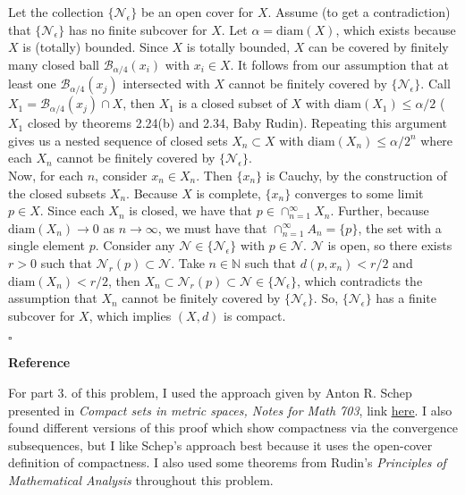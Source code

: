 \documentclass[11pt]{article}
\begin{document}
\begin{enumerate}
	Let the collection $\{\mathcal{N}_\epsilon\}$ be an open cover for $X$. Assume (to get a contradiction) that $\{\mathcal{N}_\epsilon \}$ has no finite subcover for $X$. Let $\alpha = \text{diam}(X)$, which exists because $X$ is (totally) bounded. Since $X$ is totally bounded, $X$ can be covered by finitely many closed ball $\mathcal{B}_{\alpha/4}(x_i)$ with $x_i \in X$. It follows from our assumption that at least one $\mathcal{B}_{\alpha/4}(x_j)$ intersected with $X$ cannot be finitely covered by $\{\mathcal{N}_\epsilon\}$. Call $X_1 = \mathcal{B}_{\alpha/4}(x_j) \cap X$, then $X_1$ is a closed subset of $X$ with $\text{diam}(X_1) \leq \alpha/2$ ($X_1$ closed by theorems 2.24(b) and 2.34, Baby Rudin). Repeating this argument gives us a nested sequence of closed sets $X_n \subset X$ with $\text{diam}(X_n) \leq \alpha/2^n$ where each $X_n$ cannot be finitely covered by $\{\mathcal{N}_\epsilon\}$. \\
	
	Now, for each $n$, consider $x_n \in X_n$. Then $\{x_n\}$ is Cauchy, by the construction of the closed subsets $X_n$. Because $X$ is complete, $\{x_n\}$ converges to some limit  $p \in X$. Since each $X_n$ is closed, we have that $p \in \cap^\infty_{n=1}X_n$. Further, because $\text{diam}(X_n) \to 0$ as $n\to \infty$, we must have that $\cap^\infty_{n=1}A_n = \{p\}$, the set with a single element $p$. Consider any $\mathcal{N} \in \{\mathcal{N}_\epsilon\}$ with $p\in \mathcal{N}$. $\mathcal{N}$ is open, so there exists $r > 0$ such that $\mathcal{N}_r(p) \subset \mathcal{N}$. Take $n\in \mathbb{N}$ such that $d(p,x_n) < r/2$ and $\text{diam}(X_n) < r/2$, then $X_n \subset \mathcal{N}_r(p) \subset \mathcal{N} \in\{\mathcal{N}_\epsilon\}$, which contradicts the assumption that $X_n$ cannot be finitely covered by $\{\mathcal{N}_\epsilon\}$. So, $\{\mathcal{N}_\epsilon\}$ has a finite subcover for $X$, which implies $(X,d)$ is compact.
	
	 \hfill $\square$       
\end{enumerate}


\noindent \textbf{Reference}

For part 3. of this problem, I used the approach given by Anton R. Schep presented in \textit{Compact sets in metric spaces, Notes for Math 703}, link \href{http://people.math.sc.edu/schep/compactmetric.pdf}{\underline{here}}. I also found different versions of this proof which show compactness via the convergence subsequences, but I like Schep's approach best because it uses the open-cover definition of compactness.  I also used some theorems from Rudin's \textit{Principles of Mathematical Analysis} throughout this problem. 
\end{document}
